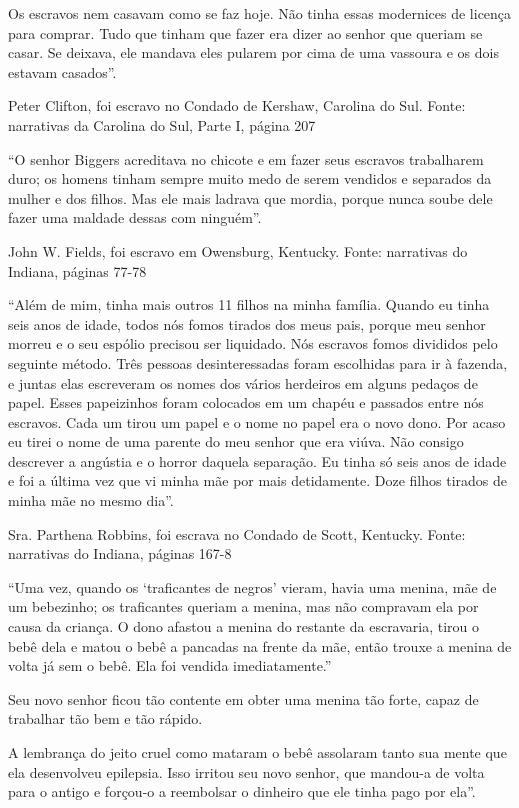 Os escravos nem casavam como se faz hoje. Não tinha essas modernices de
licença para comprar. Tudo que tinham que fazer era dizer ao senhor que
queriam se casar. Se deixava, ele mandava eles pularem por cima de uma
vassoura e os dois estavam casados''.

Peter Clifton, foi escravo no Condado de Kershaw, Carolina do Sul.
Fonte: narrativas da Carolina do Sul, Parte I, página 207

``O senhor Biggers acreditava no chicote e em fazer seus escravos
trabalharem duro; os homens tinham sempre muito medo de serem vendidos e
separados da mulher e dos filhos. Mas ele mais ladrava que mordia,
porque nunca soube dele fazer uma maldade dessas com ninguém''.

John W. Fields, foi escravo em Owensburg, Kentucky. Fonte: narrativas do
Indiana, páginas 77-78

``Além de mim, tinha mais outros 11 filhos na minha família. Quando eu
tinha seis anos de idade, todos nós fomos tirados dos meus pais, porque
meu senhor morreu e o seu espólio precisou ser liquidado. Nós escravos
fomos divididos pelo seguinte método. Três pessoas desinteressadas foram
escolhidas para ir à fazenda, e juntas elas escreveram os nomes dos
vários herdeiros em alguns pedaços de papel. Esses papeizinhos foram
colocados em um chapéu e passados entre nós escravos. Cada um tirou um
papel e o nome no papel era o novo dono. Por acaso eu tirei o nome de
uma parente do meu senhor que era viúva. Não consigo descrever a
angústia e o horror daquela separação. Eu tinha só seis anos de idade e
foi a última vez que vi minha mãe por mais detidamente. Doze filhos
tirados de minha mãe no mesmo dia''.

Sra. Parthena Robbins, foi escrava no Condado de Scott, Kentucky. Fonte:
narrativas do Indiana, páginas 167-8

``Uma vez, quando os `traficantes de negros' vieram, havia uma menina,
mãe de um bebezinho; os traficantes queriam a menina, mas não compravam
ela por causa da criança. O dono afastou a menina do restante da
escravaria, tirou o bebê dela e matou o bebê a pancadas na frente da
mãe, então trouxe a menina de volta já sem o bebê. Ela foi vendida
imediatamente.''

Seu novo senhor ficou tão contente em obter uma menina tão forte, capaz
de trabalhar tão bem e tão rápido.

A lembrança do jeito cruel como mataram o bebê assolaram tanto sua mente
que ela desenvolveu epilepsia. Isso irritou seu novo senhor, que
mandou-a de volta para o antigo e forçou-o a reembolsar o dinheiro que
ele tinha pago por ela''.

